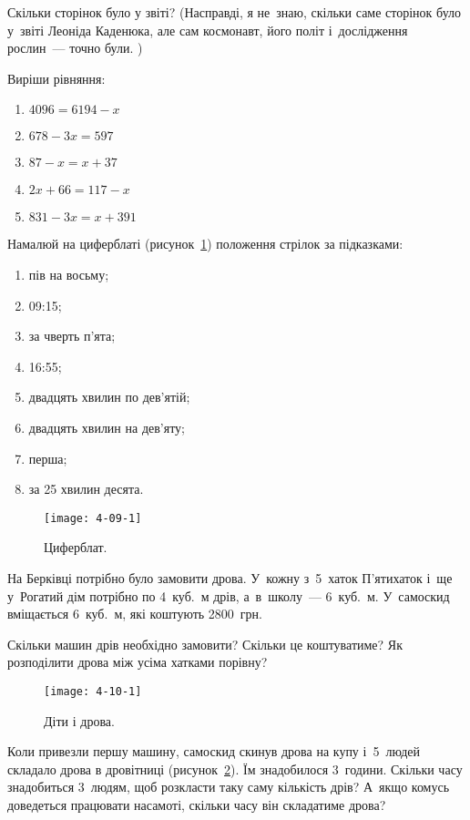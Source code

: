 Скільки сторінок було у звіті?
(Насправді, я не~знаю, скільки саме сторінок було у~звіті Леоніда Каденюка,
але сам космонавт, його політ і~дослідження рослин~--- точно були. \smiley)


\problem
Виріши рівняння:
\begin{multicols}{2}
  \begin{enumerate}
    \item $4096 = 6194 - x$
    \item $678 - 3x = 597$
    \item $87 - x = x + 37$
    \item $2x + 66 = 117 - x$
    \item $831 - 3x = x + 391$
  \end{enumerate}
\end{multicols}


\problem
Намалюй на циферблаті (рисунок~\ref{fig:clockface-2})
положення стрілок за підказками:
\begin{enumerate}
  \item пів на восьму;
  \item 09:15;
  \item за чверть п’ята;
  \item 16:55;
  \item двадцять хвилин по дев’ятій;
  \item двадцять хвилин на дев’яту;
  \item перша;
  \item за 25 хвилин десята.
\end{enumerate}

\begin{figure}[ht]
  \centering
  \texttt{[image: 4-09-1]}
  \caption{Циферблат.}
  \label{fig:clockface-2}
\end{figure}


\problem
На Берківці потрібно було замовити дрова.
У~кожну з~5~хаток П'ятихаток і~ще у~Рогатий дім потрібно по 4~куб.~м дрів,
а~в~школу~--- 6~куб.~м.
У~самоскид вміщається 6~куб.~м, які коштують 2800~грн.

Скільки машин дрів необхідно замовити? Скільки це коштуватиме?
Як розподілити дрова між усіма хатками порівну?

\begin{figure}[ht]
  \centering
  \texttt{[image: 4-10-1]}
  \caption{Діти і дрова.}
  \label{fig:children-firewood}
\end{figure}

Коли привезли першу машину, самоскид скинув дрова на купу і~5~людей
складало дрова в дровітниці (рисунок~\ref{fig:children-firewood}).
Їм знадобилося 3~години.
Скільки часу знадобиться 3~людям, щоб розкласти таку саму кількість дрів?
А~якщо комусь доведеться працювати насамоті, скільки часу він складатиме дрова?


